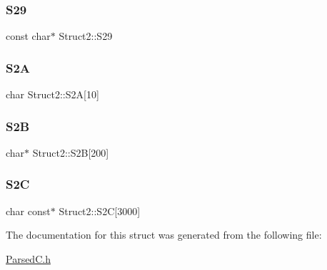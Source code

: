 \mbox{\label{structStruct2_ab7dbe557e331ce158aebc10448e33b60}} 
\subsubsection{\texorpdfstring{S29}{S29}}
{\footnotesize\ttfamily const char$\ast$ Struct2\+::\+S29}

\mbox{\label{structStruct2_a890b0c7a9c7fe62acc080ef3df9ac424}} 
\subsubsection{\texorpdfstring{S2A}{S2A}}
{\footnotesize\ttfamily char Struct2\+::\+S2A\mbox{[}10\mbox{]}}

\mbox{\label{structStruct2_a2738d564696ad23d5cc3ea0c92726962}} 
\subsubsection{\texorpdfstring{S2B}{S2B}}
{\footnotesize\ttfamily char$\ast$ Struct2\+::\+S2B\mbox{[}200\mbox{]}}

\mbox{\label{structStruct2_a33d414ff28068cbcce9a5afcaad7920b}} 
\subsubsection{\texorpdfstring{S2C}{S2C}}
{\footnotesize\ttfamily char const$\ast$ Struct2\+::\+S2C\mbox{[}3000\mbox{]}}



The documentation for this struct was generated from the following file\+:\begin{DoxyCompactItemize}
\item 
\hyperlink{ParsedC_8h}{Parsed\+C.\+h}\end{DoxyCompactItemize}
